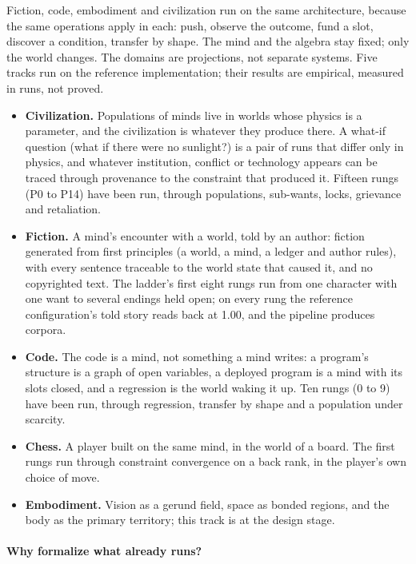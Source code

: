 \documentclass[11pt]{article}
\theoremstyle{remark}
\begin{document}
Fiction, code, embodiment and civilization run on the same architecture, because the same
operations apply in each: push, observe the outcome, fund a slot, discover a condition,
transfer by shape. The mind and the algebra stay fixed; only the world changes. The
domains are projections, not separate systems. Five tracks run on the reference
implementation; their results are empirical, measured in runs, not proved.
\begin{itemize}[nosep]
    \item \textbf{Civilization.} Populations of minds live in worlds whose physics is a
    parameter, and the civilization is whatever they produce there. A what-if question
    (what if there were no sunlight?) is a pair of runs that differ only in physics, and
    whatever institution, conflict or technology appears can be traced through provenance
    to the constraint that produced it. Fifteen rungs (P0 to P14) have been run, through
    populations, sub-wants, locks, grievance and retaliation.
    \item \textbf{Fiction.} A mind's encounter with a world, told by an author: fiction
    generated from first principles (a world, a mind, a ledger and author rules), with every
    sentence traceable to the world state that caused it, and no copyrighted text. The
    ladder's first eight rungs run from one character with one want to several endings held
    open; on every rung the reference configuration's told story reads back at 1.00, and
    the pipeline produces corpora.
    \item \textbf{Code.} The code is a mind, not something a mind writes: a program's
    structure is a graph of open variables, a deployed program is a mind with its slots
    closed, and a regression is the world waking it up. Ten rungs (0 to 9) have been run,
    through regression, transfer by shape and a population under scarcity.
    \item \textbf{Chess.} A player built on the same mind, in the world of a board. The
    first rungs run through constraint convergence on a back rank, in the player's own
    choice of move.
    \item \textbf{Embodiment.} Vision as a gerund field, space as bonded regions, and the
    body as the primary territory; this track is at the design stage.
\end{itemize}

\paragraph{Why formalize what already runs?}
\end{document}
